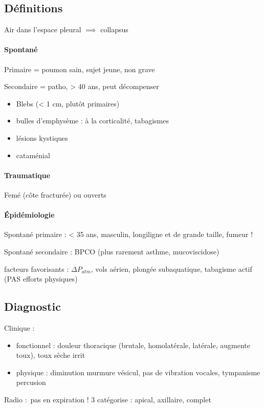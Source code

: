 \documentclass{article}
\begin{document}
\subsection{Définitions}
Air dans l'espace pleural $\implies$ collapsus 

\paragraph{Spontané}
Primaire = poumon sain, sujet jeune, non grave

Secondaire = patho, > 40 ans, peut décompenser

\begin{itemize}
  \item Blebs (< 1 cm, plutôt primaires)
  \item bulles d'emphysème : à la corticalité, tabagismes
  \item lésions kystiques
  \item cataménial
\end{itemize}

\paragraph{Traumatique}
Femé (côte fracturée) ou ouverts

\paragraph{Épidémiologie}
Spontané primaire : < 35 ans, masculin, longiligne et de grande taille, fumeur !

Spontané secondaire : BPCO (plus rarement asthme, mucoviscidose)

facteurs favorisants : $\Delta P_{atm}$, vols aérien, plongée subaquatique,
tabagisme actif (PAS
efforts physiques)

\subsection{Diagnostic}
Clinique : 
\begin{itemize}
  \item fonctionnel : douleur thoracique (brutale, homolatérale, latérale,
    augmente toux), toux sèche irrit
  \item physique : diminution murmure vésicul, pas de vibration vocales,
    tympanisme percusion
\end{itemize}
Radio : pas en expiration ! 3 catégorise : apical, axillaire, complet
\end{document}
